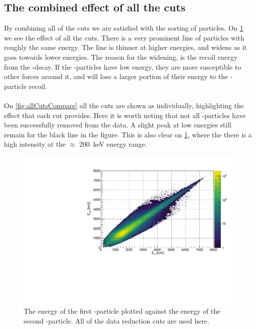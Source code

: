 \subsection{The combined effect of all the cuts}
By combining all of the cuts we are satisfied with the sorting of particles. 
On \cref{fig:EEAllCuts} we see the effect of all the cuts.
There is a very prominent line of particles with roughly the same energy. 
The line is thinner at higher energies, and widens as it goes towards lower energies. 
The reason for the widening, is the recoil energy from the \be-decay.
If the \al-particles have low energy, they are more susceptible to other forces around it, and will lose a larger portion of their energy to the \be-particle recoil. \\
\\
On \cref{fig:allCutsCompare} all the cuts are shown as individually, highlighting the effect that each cut provides. Here it is worth noting that not all \be-particles have been successfully removed from the data. A slight peak at low energies still remain for the black line in the figure. This is also clear on \cref{fig:EEAllCuts}, where the there is a high intensity at the $\approx$ \SI{200}{keV} energy range. 

\begin{figure}[h]
	\centering
	\includegraphics[width=\linewidth]{../figures/EE.pdf}
	\caption{The energy of the first \al-particle plotted against the energy of the second \al-particle. All of the data reduction cuts are used here.}
	\label{fig:EEAllCuts}
\end{figure}

